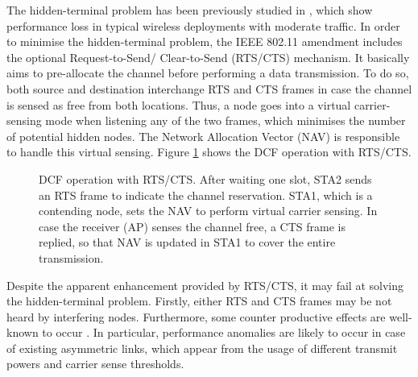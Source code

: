 \documentclass[12pt, a4paper,twoside]{tesi_upf}
\begin{document}
			The hidden-terminal problem has been previously studied in \cite{ekici2008ieee, jang2012ieee}, which show performance loss in typical wireless deployments with moderate traffic. In order to minimise the hidden-terminal problem, the IEEE 802.11 amendment includes the optional Request-to-Send/ Clear-to-Send (RTS/CTS) mechanism. It basically aims to pre-allocate the channel before performing a data transmission. To do so, both source and destination interchange RTS and CTS frames in case the channel is sensed as free from both locations. Thus, a node goes into a virtual carrier-sensing mode when listening any of the two frames, which minimises the number of potential hidden nodes. The Network Allocation Vector (NAV) is responsible to handle this virtual sensing. Figure \ref{fig:dcf_operation} shows the DCF operation with RTS/CTS.					
			\begin{figure}[h!]
				\centering
				\caption{DCF operation with RTS/CTS. After waiting one slot, STA2 sends an RTS frame to indicate the channel reservation. STA1, which is a contending node, sets the NAV to perform virtual carrier sensing. In case the receiver (AP) senses the channel free, a CTS frame is replied, so that NAV is updated in STA1 to cover the entire transmission.}
				\label{fig:dcf_operation}
			\end{figure}
		
			Despite the apparent enhancement provided by RTS/CTS, it may fail at solving the hidden-terminal problem. Firstly, either RTS and CTS frames may be not heard by interfering nodes. Furthermore, some counter productive effects are well-known to occur \cite{sobrinho2005rts}. In particular, performance anomalies are likely to occur in case of existing asymmetric links, which appear from the usage of different transmit powers and carrier sense thresholds.
					
\end{document}
